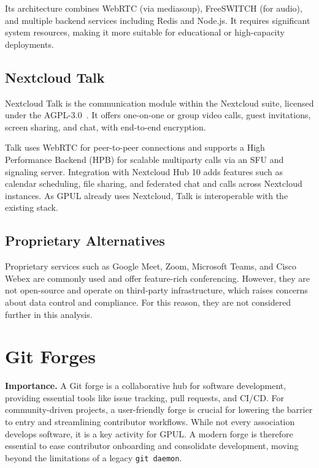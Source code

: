 Its architecture combines WebRTC (via mediasoup), FreeSWITCH (for audio), and multiple backend services including Redis and Node.js. It requires significant system resources, making it more suitable for educational or high-capacity deployments.

\subsection*{Nextcloud Talk}

Nextcloud Talk is the communication module within the Nextcloud suite, licensed under the AGPL-3.0~\cite{nextcloud-talk-docs}. It offers one-on-one or group video calls, guest invitations, screen sharing, and chat, with end-to-end encryption.

Talk uses WebRTC for peer-to-peer connections and supports a High Performance Backend (HPB) for scalable multiparty calls via an SFU and signaling server. Integration with Nextcloud Hub 10 adds features such as calendar scheduling, file sharing, and federated chat and calls across Nextcloud instances. As GPUL already uses Nextcloud, Talk is interoperable with the existing stack.

\subsection*{Proprietary Alternatives}

Proprietary services such as Google Meet, Zoom, Microsoft Teams, and Cisco Webex are commonly used and offer feature-rich conferencing. However, they are not open-source and operate on third-party infrastructure, which raises concerns about data control and compliance. For this reason, they are not considered further in this analysis.
\section{Git Forges}

\textbf{Importance.} A Git forge is a collaborative hub for software development, providing essential tools like issue tracking, pull requests, and CI/CD. For community-driven projects, a user-friendly forge is crucial for lowering the barrier to entry and streamlining contributor workflows. While not every association develops software, it is a key activity for GPUL. A modern forge is therefore essential to ease contributor onboarding and consolidate development, moving beyond the limitations of a legacy \texttt{git daemon}.

